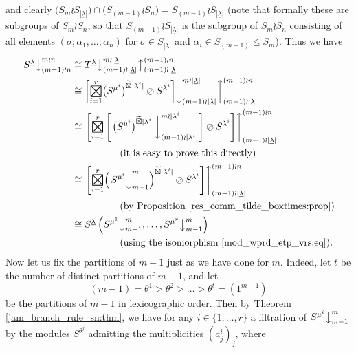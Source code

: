 \documentclass[ALCO,Unicode,published]{cedram}
\DeclareMathOperator*{\bigboxtimes}{\raisebox{-3pt}{\scalebox{1.7}{$\boxtimes$}}}
\newcommand{\ul}[1]{\underline{#1}}
\begin{document}
and clearly $\bigl(S_m \wr S_{|\ul{\lambda}|}\bigr) \cap \bigl(S_{(m-1)} \wr S_n\bigr) = S_{(m-1)} \wr S_{|\ul{\lambda}|}$ (note that formally these
are subgroups of $S_m \wr S_n$, so that $S_{(m-1)} \wr S_{|\ul{\lambda}|}$ is the subgroup of $S_m \wr S_n$ consisting of all elements
$(\sigma;\alpha_1,\ldots,\alpha_n)$ for $\sigma \in S_{|\ul{\lambda}|}$ and $\alpha_i \in S_{(m-1)} \leqslant S_m$). Thus we have
\begin{align*}
\left.S^{\ul{\lambda}}\right\downarrow^{m \wr n}_{(m-1) \wr n}
&\cong T^{\ul{\lambda}}
\bigl\downarrow^{m{\wr}|\ul{\lambda}|}_{(m-1){\wr}|\ul{\lambda}|}
\bigl\uparrow^{(m-1) \wr n}_{(m-1){\wr}|\ul{\lambda}|}\\
&\cong
\left[\bigboxtimes^r_{i=1} \bigl(S^{\mu^i}\bigr)^{\widetilde\boxtimes |\lambda^i|}\oslash S^{\lambda^i}\right]
\biggr\downarrow^{m{\wr}|\ul{\lambda}|}_{(m-1){\wr}|\ul{\lambda}|}
\biggr\uparrow^{(m-1) \wr n}_{(m-1){\wr}|\ul{\lambda}|}\\
&\cong
\left.\left[
\bigboxtimes^r_{i=1} \left[\left.\bigl(S^{\mu^i}\bigr)^{\widetilde\boxtimes |\lambda^i|}
\right\downarrow^{m \wr |\lambda^i|}_{(m-1) \wr |\lambda^i|}\right]
\oslash S^{\lambda^i}\right]\right\uparrow^{(m-1) \wr n}_{(m-1){\wr}|\ul{\lambda}|}\\
&\hspace{5em}\text{(it is easy to prove this directly)}\\
&\cong
\left.\left[
\bigboxtimes^r_{i=1} \Bigl(\left.S^{\mu^i}\right\downarrow^{m}_{m-1}\Bigr)^{\widetilde\boxtimes |\lambda^i|}
\oslash S^{\lambda^i}\right]\right\uparrow^{(m-1) \wr n}_{(m-1){\wr}|\ul{\lambda}|}\\
&\hspace{5em}\text{(by Proposition \ref{res_comm_tilde_boxtimes:prop})}\\
&\cong
S^{\ul{\lambda}}\left(S^{\mu^1}\bigr\downarrow^m_{m-1},\ldots,S^{\mu^r}\bigr\downarrow^m_{m-1}\right)\\
&\hspace{5em}\text{(using the isomorphism \eqref{mod_wprd_etp_vrs:eq}).}
\end{align*}
Now let us fix the partitions of $m-1$ just as we have done for $m$. Indeed, let $t$ be the number of distinct partitions of $m-1$, and
let
\[ (m-1) = \theta^1 > \theta^2 > \ldots > \theta^t = (1^{m-1}) \]
be the partitions of $m-1$ in lexicographic order. Then by Theorem \ref{jam_branch_rule_sn:thm}, we have for any $i \in \{1,\ldots,r\}$
a filtration of $S^{\mu^i}\bigr\downarrow^{m}_{m-1}$ by the modules $S^{\theta^j}$ admitting the multiplicities $(a^i_j)_j$, where
\end{document}
